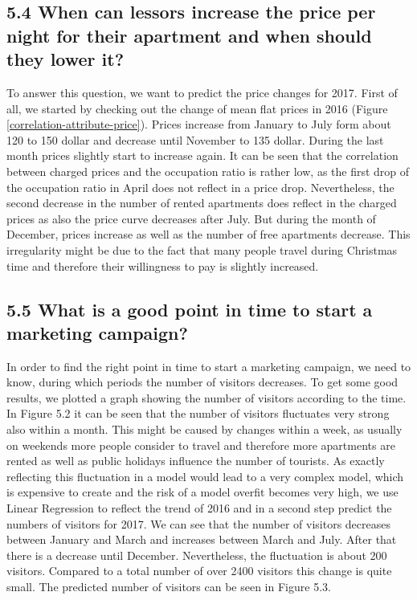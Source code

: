 \subsection{5.4	When can lessors increase the price per night for their apartment and when should they lower it?}
To answer this question, we want to predict the price changes for 2017. First of all, we started by checking out the change of mean flat prices in 2016 (Figure \ref{correlation-attribute-price}). 
Prices increase from January to July form about 120 to 150 dollar and decrease until November to 135 dollar. During the last month prices slightly start to increase again. It can be seen that the correlation between charged prices and the occupation ratio is rather low, as the first drop of the occupation ratio in April does not reflect in a price drop. Nevertheless, the second decrease in the number of rented apartments does reflect in the charged prices as also the price curve decreases after July. But during the month of December, prices increase as well as the number of free apartments decrease. This irregularity might be due to the fact that many people travel during Christmas time and therefore their willingness to pay is slightly increased. 

\subsection{5.5	What is a good point in time to start a marketing campaign?}
In order to find the right point in time to start a marketing campaign, we need to know, during which periods the number of visitors decreases. To get some good results, we plotted a graph showing the number of visitors according to the time.
In Figure 5.2 it can be seen that the number of visitors fluctuates very strong also within a month. This might be caused by changes within a week, as usually on weekends more people consider to travel and therefore more apartments are rented as well as public holidays influence the number of tourists. As exactly reflecting this fluctuation in a model would lead to a very complex model, which is expensive to create and the risk of a model overfit becomes very high, we use Linear Regression to reflect the trend of 2016 and in a second step predict the numbers of visitors for 2017. We can see that the number of visitors decreases between January and March and increases between March and July. After that there is a decrease until December. Nevertheless, the fluctuation is about 200 visitors. Compared to a total number of over 2400 visitors this change is quite small.
The predicted number of visitors can be seen in Figure 5.3.


